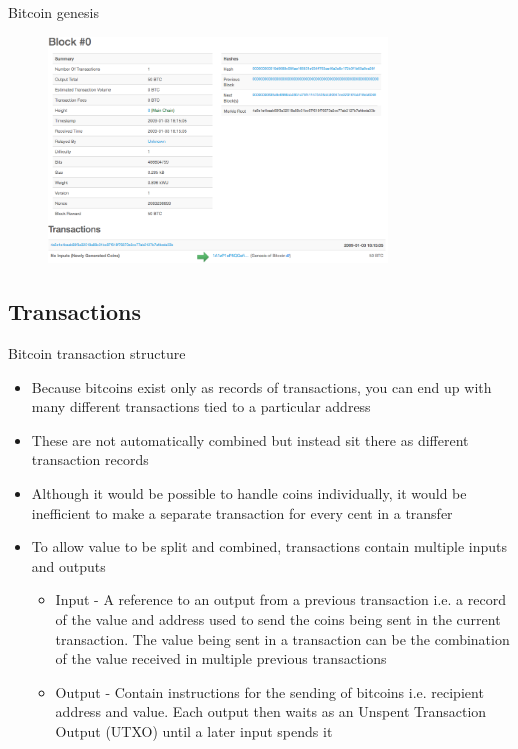 \documentclass[9pt]{beamer}
\begin{document}

\begin{frame}{Bitcoin genesis}
	\begin{figure}[]
		\centering
		\includegraphics  [width=90mm]{Images/genesis}
	\end{figure}
\end{frame}


\subsection{Transactions}

\begin{frame}{Bitcoin transaction structure}
	\begin{itemize}
		\item Because bitcoins exist only as records of transactions, you can end up with many different transactions tied to a particular address
		\item These are not automatically combined but instead sit there as different transaction records
		\item Although it would be possible to handle coins individually, it would be inefficient to make a separate transaction for every cent in a transfer
		\item To allow value to be split and combined, transactions contain multiple inputs and outputs
		\begin{itemize}
			\item Input - A reference to an output from a previous transaction i.e. a record of the value and address used to send the coins being sent in the current transaction. The value being sent in a transaction can be the combination of the value received in multiple previous transactions
			\item Output - Contain instructions for the sending of bitcoins i.e. recipient address and value. Each output then waits as an Unspent Transaction Output (UTXO) until a later input spends it
		\end{itemize}
	\end{itemize}
\end{frame}
\end{document}
